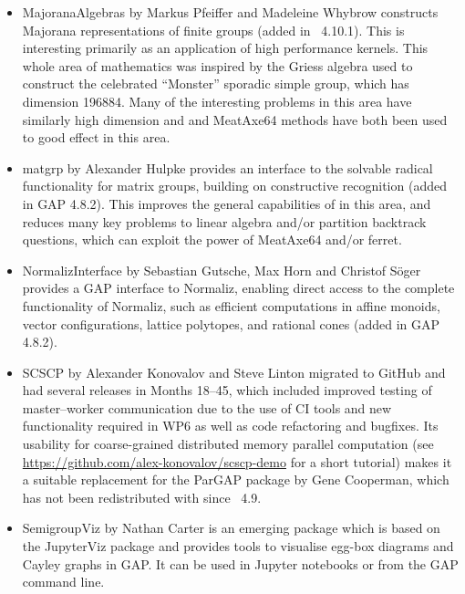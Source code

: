 \begin{itemize}
\item
{\sf MajoranaAlgebras} by Markus Pfeiffer and Madeleine Whybrow \cite{MajoranaAlgebras}
constructs Majorana representations of finite groups (added in
\GAP~4.10.1). This is interesting primarily as an application of high
performance kernels. This whole area of mathematics was inspired by
the Griess algebra used to construct the celebrated ``Monster''
sporadic simple group, which has dimension 196884. Many of the
interesting problems in this area have similarly high dimension and
\HPCGAP and {\sf MeatAxe64} methods have both been used to good effect in
this area.
%
%

\item
{\sf matgrp}  by Alexander Hulpke \cite{matgrp} provides an interface
to the solvable radical functionality for matrix groups, building on
constructive recognition (added in GAP 4.8.2). This improves the
general capabilities of \GAP in this area, and reduces many key
problems to linear algebra and/or partition backtrack questions, which
can exploit the power of {\sf MeatAxe64} and/or {\sf ferret}.

\item
{\sf NormalizInterface} by Sebastian Gutsche, Max Horn and
Christof S\"oger \cite{NormalizInterface} provides a GAP interface to Normaliz, enabling
direct access to the complete functionality of Normaliz, such as efficient
computations in affine monoids, vector configurations, lattice
polytopes, and rational cones (added in GAP 4.8.2). 

\item
{\sf SCSCP} by Alexander Konovalov and Steve Linton \cite{SCSCP}
migrated to GitHub and had several releases
in Months 18--45, which included improved testing of 
master--worker communication due to the use of
CI tools and new functionality required in WP6 as well as
code refactoring and bugfixes. Its usability for 
coarse-grained distributed memory parallel computation
(see \url{https://github.com/alex-konovalov/scscp-demo}
for a short tutorial) makes it a suitable replacement for the {\sf ParGAP}
package by Gene Cooperman, which has not been redistributed 
with \GAP since \GAP~4.9.

\item
{\sf SemigroupViz} by Nathan Carter \cite{SemigroupViz} is an emerging
package which is based on the {\sf JupyterViz} package \cite{JupyterViz}
and provides tools to visualise egg-box diagrams and Cayley graphs in
GAP. It can be used in Jupyter notebooks or from the GAP command line.
%
%


\end{itemize}
